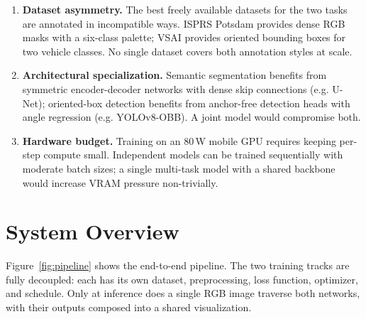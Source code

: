 \documentclass[11pt,a4paper]{article}
\begin{document}
\begin{enumerate}[leftmargin=*, itemsep=3pt]
  \item \textbf{Dataset asymmetry.} The best freely available datasets for the two
    tasks are annotated in incompatible ways. ISPRS Potsdam provides dense RGB masks
    with a six-class palette; VSAI provides oriented bounding boxes for two vehicle
    classes. No single dataset covers both annotation styles at scale.
  \item \textbf{Architectural specialization.} Semantic segmentation benefits from
    symmetric encoder-decoder networks with dense skip connections (e.g. U-Net);
    oriented-box detection benefits from anchor-free detection heads with angle
    regression (e.g. YOLOv8-OBB). A joint model would compromise both.
  \item \textbf{Hardware budget.} Training on an 80\,W mobile GPU requires keeping
    per-step compute small. Independent models can be trained sequentially with
    moderate batch sizes; a single multi-task model with a shared backbone would
    increase VRAM pressure non-trivially.
\end{enumerate}

\section{System Overview}

Figure~\ref{fig:pipeline} shows the end-to-end pipeline. The two
training tracks are fully decoupled: each has its own dataset, preprocessing,
loss function, optimizer, and schedule. Only at inference does a single RGB image
traverse both networks, with their outputs composed into a shared visualization.
\end{document}
